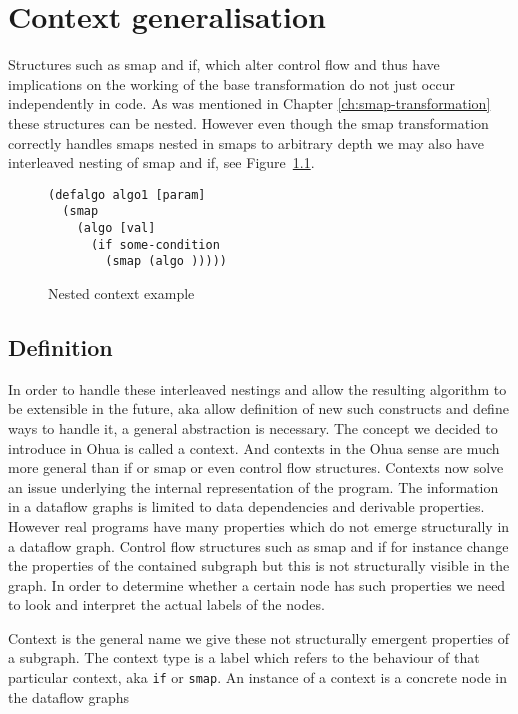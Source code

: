 \chapter{Context generalisation}

\label{ch:Context}

Structures such as smap and if, which alter control flow and thus have implications on the working of the \yauhau{} base transformation do not just occur independently in code.
As was mentioned in Chapter \ref{ch:smap-transformation} these structures can be nested.
However even though the smap transformation correctly handles smaps nested in smaps to arbitrary depth we may also have interleaved nesting of smap and if, see Figure~\ref{fig:nested-context-example}.

\begin{figure}
\begin{verbatim}
(defalgo algo1 [param]
  (smap
    (algo [val]
      (if some-condition
        (smap (algo )))))
\end{verbatim}
\caption{Nested context example}
\label{fig:nested-context-example}
\end{figure}

\section{Definition}

In order to handle these interleaved nestings and allow the resulting algorithm to be extensible in the future, aka allow definition of new such constructs and define ways to handle it, a general abstraction is necessary.
The concept we decided to introduce in Ohua is called a context.
And contexts in the Ohua sense are much more general than if or smap or even control flow structures.
Contexts now solve an issue underlying the internal representation of the program.
The information in a dataflow graphs is limited to data dependencies and derivable properties.
However real programs have many properties which do not emerge structurally in a dataflow graph.
Control flow structures such as smap and if for instance change the properties of the contained subgraph but this is not structurally visible in the graph.
In order to determine whether a certain node has such properties we need to look and interpret the actual labels of the nodes.

Context is the general name we give these not structurally emergent properties of a subgraph.
The context type is a label which refers to the behaviour of that particular context, aka \texttt{if} or \texttt{smap}.
An instance of a context is a concrete node in the dataflow graphs

